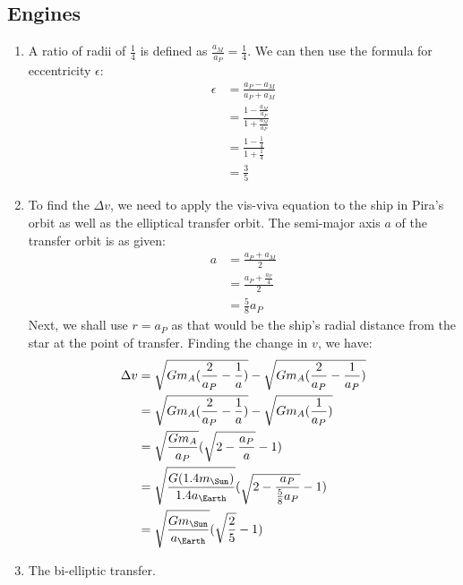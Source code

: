 \documentclass{article}
\begin{document}
\subsection{Engines}
\begin{enumerate}
\item A ratio of radii of $\frac{1}{4}$ is defined as $\frac{a_M}{a_P}=\frac{1}{4}$. We can then use the formula for eccentricity $\epsilon$:
\begin{equation}
\begin{split}
\epsilon&=\frac{a_P-a_M}{a_P+a_M}\\
&=\frac{1-\frac{a_M}{a_P}}{1+\frac{a_M}{a_P}}\\
&=\frac{1-\frac{1}{4}}{1+\frac{1}{4}}\\
&=\frac{3}{5}
\end{split}
\end{equation}
\item To find the $\Delta v$, we need to apply the vis-viva equation to the ship in Pira's orbit as well as the elliptical transfer orbit. The semi-major axis $a$ of the transfer orbit is as given:
\begin{equation}
\begin{split}
a&=\frac{a_P+a_M}{2}\\
&=\frac{a_P+\frac{a_P}{4}}{2}\\
&=\frac{5}{8}a_P
\end{split}
\end{equation}
Next, we shall use $r=a_P$ as that would be the ship's radial distance from the star at the point of transfer. Finding the change in $v$, we have:
\begin{equation}
\begin{split}
\Delta v&=\sqrt{Gm_A(\frac{2}{a_P}-\frac{1}{a})}-\sqrt{Gm_A(\frac{2}{a_P}-\frac{1}{a_P})}\\
&=\sqrt{Gm_A(\frac{2}{a_P}-\frac{1}{a})}-\sqrt{Gm_A(\frac{1}{a_P})}\\
&=\sqrt{\frac{Gm_A}{a_P}}(\sqrt{2-\frac{a_P}{a}}-1)\\
&=\sqrt{\frac{G(1.4m_\Sun)}{1.4a_\Earth}}(\sqrt{2-\frac{a_P}{\frac{5}{8}a_P}}-1)\\
&=\sqrt{\frac{Gm_\Sun}{a_\Earth}}(\sqrt{\frac{2}{5}}-1)
\end{split}
\end{equation}
\item The bi-elliptic transfer.
\end{enumerate}
\end{document}
